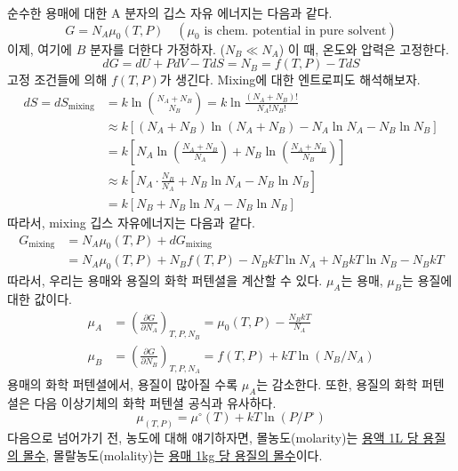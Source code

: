 \documentclass{article}
\begin{document}
순수한 용매에 대한 A 분자의 깁스 자유 에너지는 다음과 같다.
\begin{equation}
    G = N_A \mu_0 (T,P) \quad (\mu_0 \text{ is chem. potential in pure solvent})
\end{equation}
이제, 여기에 $B$ 분자를 더한다 가정하자. ($N_B \ll N_A$) 이 때, 온도와 압력은 고정한다.
\begin{equation}
    dG = dU + PdV - TdS = N_B = f(T,P) -TdS
\end{equation}
고정 조건들에 의해 $f(T,P)$가 생긴다. Mixing에 대한 엔트로피도 해석해보자.
\begin{align}
    dS = dS_{\text{mixing}} &= k \ln \binom{N_A + N_B}{N_B} = k \ln \frac{(N_A + N_B)!}{N_A ! N_B !}\\
    &\approx k [ (N_A + N_B) \ln (N_A + N_B) - N_A \ln N_A - N_B \ln N_B]\\
    &= k \left[ N_A \ln \left( \frac{N_A + N_B}{N_A} \right) + N_B \ln \left( \frac{N_A + N_B}{N_B} \right) \right]\\
    &\approx k \left[ N_A \cdot \frac{N_B}{N_A} + N_B \ln N_A - N_B \ln N_B \right]\\
    &= k [N_B + N_B \ln N_A - N_B \ln N_B]
\end{align}
따라서, mixing 깁스 자유에너지는 다음과 같다.
\begin{align}
    G_{\text{mixing}} &= N_A \mu_0 (T,P) + dG_{\text{mixing}}\\
    &= N_A \mu_0 (T,P) + N_B f(T,P) - N_B kT \ln N_A + N_B kT \ln N_B - N_B kT
\end{align}
따라서, 우리는 용매와 용질의 화학 퍼텐셜을 계산할 수 있다. $\mu_A$는 용매, $\mu_B$는 용질에 대한 값이다.
\begin{align}
    \mu_A &= \left( \frac{\partial G}{\partial N_A} \right)_{T,P,N_B} = \mu_0 (T,P) - \frac{N_B kT}{N_A}\\
    \mu_B &= \left( \frac{\partial G}{\partial N_B} \right)_{T,P,N_A} = f(T,P) + kT \ln (N_B / N_A)
\end{align}
용매의 화학 퍼텐셜에서, 용질이 많아질 수록 $\mu_A$는 감소한다. 또한, 용질의 화학 퍼텐셜은 다음 이상기체의 화학 퍼텐셜 공식과 유사하다.
\begin{equation}
    \mu_(T,P) = \mu^\circ (T) + kT \ln (P/P^\circ)
\end{equation}
다음으로 넘어가기 전, 농도에 대해 얘기하자면, 몰농도(molarity)는 \underline{용액 1L 당 용질의 몰수}, 몰랄농도(molality)는 \underline{용매 1kg 당 용질의 몰수}이다.

\newpage
\end{document}
